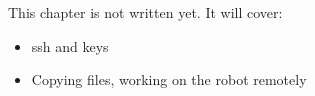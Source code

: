 \label{ch:linux2}
\begin{keyidea}
This chapter is not written yet. It will cover:
\begin{itemize}[nosep]
  \item ssh and keys
  \item Copying files, working on the robot remotely
\end{itemize}
\end{keyidea}
